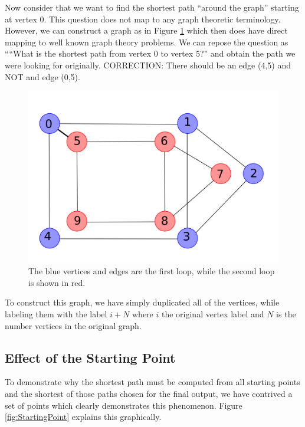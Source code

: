 \documentclass{InsightArticle}
\begin{document}
Now consider that we want to find the shortest path ``around the graph'' starting at vertex 0. This question does not map to any graph theoretic terminology. However, we can construct a graph as in Figure \ref{fig:TwoLoops2} which then does have direct mapping to well known graph theory problems. We can repose the question as ````What is the shortest path from vertex 0 to vertex 5?'' and obtain the path we were looking for originally. CORRECTION: There should be an edge (4,5) and NOT and edge (0,5).
\begin{figure}[H]
  \centering
  \includegraphics[width=0.3\linewidth]{images/TwoLoops2}
  \caption{The blue vertices and edges are the first loop, while the second loop is shown in red.}
  \label{fig:TwoLoops2}
\end{figure}

To construct this graph, we have simply duplicated all of the vertices, while labeling them with the label $i+N$ where $i$ the original vertex label and $N$ is the number vertices in the original graph.

\subsection{Effect of the Starting Point}
\label{sec:Algorithm:StartingPoint}
To demonstrate why the shortest path must be computed from all starting points and the shortest of those paths chosen for the final output, we have contrived a set of points which clearly demonstrates this phenomenon. Figure \ref{fig:StartingPoint} explains this graphically.
\end{document}
